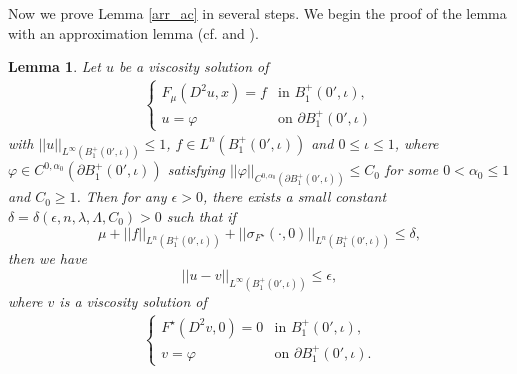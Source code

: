 \documentclass[11pt, reqno]{amsart}
\newtheorem{lemma}[theorem]{Lemma}
\numberwithin{equation}{section}
\begin{document}
Now we prove Lemma \ref{arr_ac} in several steps. 
We begin the proof of the lemma with an approximation lemma (cf. \cite[Lemma 3.1]{MR3957152} and \cite[Proposition 3.2]{MR2486925}).

\begin{lemma} \label{asyconapp}
Let $u$ be a viscosity solution of
\begin{align*}
\left\{ \begin{array}{ll}
F_{\mu}(D^{2}u,x) = f & \textrm{in $B_{1}^{+}(0',\iota), $}\\
u=\varphi & \textrm{on $\partial B_{1}^{+}(0',\iota)$}
\end{array} \right.
\end{align*}
with $||u||_{L^{\infty}(B_{1}^{+}(0',\iota))} \le 1$, $f \in L^{n}(B_{1}^{+}(0',\iota)) $ and $0\le\iota\le1$,
where $\varphi\in C^{0,\alpha_0}(\partial B_{1}^{+}(0',\iota))$ satisfying $||\varphi||_{C^{0,\alpha_0}(\partial B_{1}^{+}(0',\iota))}\le C_0$ for some $0<\alpha_0\le1$ and $C_0\ge 1$.
Then for any $\epsilon >0$, there exists a small constant $\delta = \delta (\epsilon,n, \lambda, \Lambda,C_0)>0$  such that if
$$\mu + ||f||_{L^{n}( B_{1}^{+}(0',\iota)) }+||\sigma_{F^{\star}}(\cdot,0)||_{L^{n}(B_{1}^{+}(0',\iota)) } \le \delta,$$
then we have $$||u-v||_{L^{\infty}(B_{1}^{+}(0',\iota))} \le \epsilon ,$$
where $v$ is a viscosity solution of
\begin{align} \label{limpro1}
\left\{ \begin{array}{ll}
F^{\star}(D^{2}v,0) = 0 & \textrm{in $B_{1}^{+}(0',\iota), $}\\
v=\varphi  & \textrm{on $\partial B_{1}^{+}(0',\iota) $.} 
\end{array} \right.
\end{align}
\end{lemma}
\end{document}
